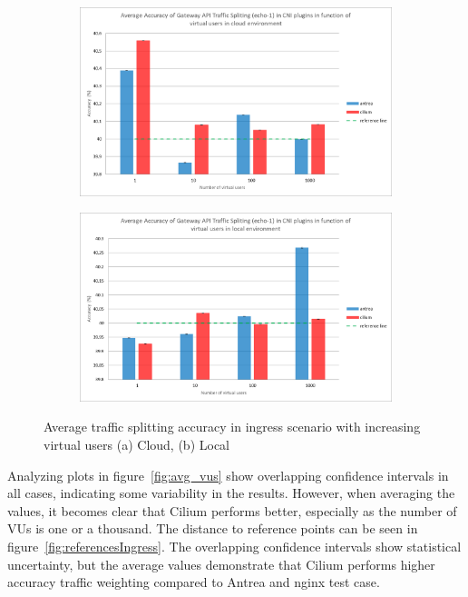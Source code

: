 \begin{figure}[H]
    \centering
    \begin{subfigure}[b]{0.6\textwidth}
        \includegraphics[width=\textwidth]{plots/traffic-splitting/vus_cloud_all.png}
        \caption{}
        \label{fig:vus_cloud_avg}
    \end{subfigure}
    \begin{subfigure}[b]{0.6\textwidth}
        \includegraphics[width=\textwidth]{plots/traffic-splitting/vus_local_all.png}
        \caption{}
        \label{fig:vus_local_avg}
    \end{subfigure}
    
    \caption{Average traffic splitting accuracy in ingress scenario with increasing virtual users (a) Cloud, (b) Local}
    \label{fig:vus_avg}
\end{figure}


Analyzing plots in figure~\ref{fig:avg_vus} show overlapping confidence intervals in all cases, indicating some variability in the results. However, when averaging the values, it becomes clear that Cilium performs better, especially as the number of VUs is one or a thousand. The distance to reference points can be seen in figure~\ref{fig:referencesIngress}. The overlapping confidence intervals show statistical uncertainty, but the average values demonstrate that Cilium performs higher accuracy traffic weighting compared to Antrea and nginx test case.


